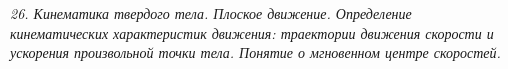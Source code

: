 \emph{26. Кинематика твердого тела. Плоское движение. Определение кинематических
характеристик движения: траектории движения скорости и ускорения
произвольной точки тела. Понятие о мгновенном центре скоростей.}

\newpage %
